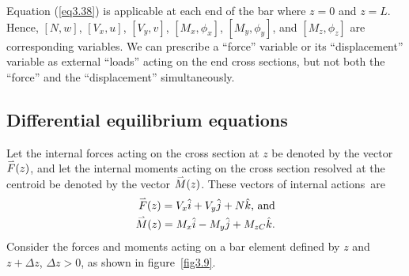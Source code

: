 \documentclass{AeroStructure-ERJohnson}
\def\harp#1{\smash{\mathord{\buildrel{\lower3pt\hbox{$\scriptscriptstyle\rightharpoonup$}}\over{#1}}}}
\begin{document}
\removelastskip

Equation (\ref{eq3.38}) is applicable at each end of the bar where $z = 0$ and $z = L$. Hence, $[N, w]$, $[V_{x}, u]$, $[V_{y}, v]$, $[M_{x}, \phi_{x}]$, $[M_{y}, \phi_{y}]$, and $[M_{z}, \phi_{z}]$ are corresponding variables. We can prescribe a ``force'' variable or its  ``displacement'' variable as external ``loads'' acting on the end cross sections, but not both the ``force'' and the ``displacement'' simultaneously.

\subsection{Differential equilibrium equations}\label{sec3.6.1}

Let the internal forces acting on the cross section at $z$ be denoted by the vector $\harp{F}(z)$, and let the internal moments acting on the cross section resolved at the centroid be denoted by the vector $\harp{M}(z)$. These vectors of internal actions~are
\begin{align}
\harp{F}(z)=V_{x} \hat{i}+V_{y} \hat{j}+N \hat{k}\mbox{, and}\label{eq3.46}\\
\harp{M}(z)=M_{x} \hat{i}-M_{y} \hat{j}+M_{z C} \hat{k}.\label{eq3.47}
\end{align}
Consider the forces and moments acting on a bar element defined by $z$ and $z+ \Delta z$, $\Delta z>0$, as shown in figure~\ref{fig3.9}.

{\def\thefigure{3.9}
}
\end{document}
